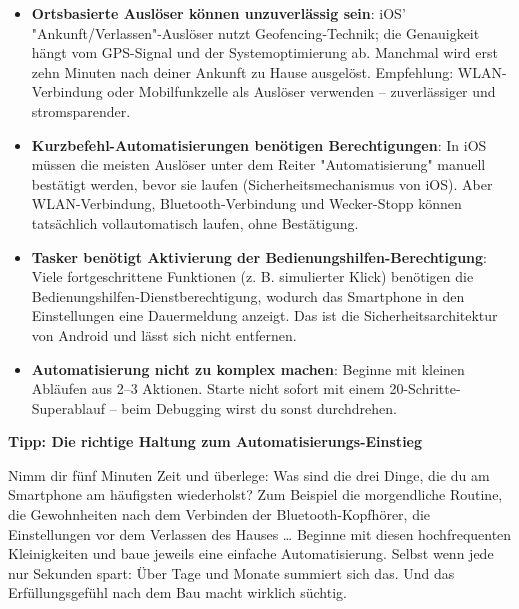 \begin{itemize}
  \item \textbf{Ortsbasierte Auslöser können unzuverlässig sein}: iOS' "Ankunft/Verlassen"-Auslöser nutzt Geofencing-Technik; die Genauigkeit hängt vom GPS-Signal und der Systemoptimierung ab. Manchmal wird erst zehn Minuten nach deiner Ankunft zu Hause ausgelöst. Empfehlung: WLAN-Verbindung oder Mobilfunkzelle als Auslöser verwenden – zuverlässiger und stromsparender.
  \item \textbf{Kurzbefehl-Automatisierungen benötigen Berechtigungen}: In iOS müssen die meisten Auslöser unter dem Reiter "Automatisierung" manuell bestätigt werden, bevor sie laufen (Sicherheitsmechanismus von iOS). Aber WLAN-Verbindung, Bluetooth-Verbindung und Wecker-Stopp können tatsächlich vollautomatisch laufen, ohne Bestätigung.
  \item \textbf{Tasker benötigt Aktivierung der Bedienungshilfen-Berechtigung}: Viele fortgeschrittene Funktionen (z. B. simulierter Klick) benötigen die Bedienungshilfen-Dienstberechtigung, wodurch das Smartphone in den Einstellungen eine Dauermeldung anzeigt. Das ist die Sicherheitsarchitektur von Android und lässt sich nicht entfernen.
  \item \textbf{Automatisierung nicht zu komplex machen}: Beginne mit kleinen Abläufen aus 2–3 Aktionen. Starte nicht sofort mit einem 20-Schritte-Superablauf – beim Debugging wirst du sonst durchdrehen.
\end{itemize}

\textbf{Tipp: Die richtige Haltung zum Automatisierungs-Einstieg}\par

Nimm dir fünf Minuten Zeit und überlege: Was sind die drei Dinge, die du am Smartphone am häufigsten wiederholst? Zum Beispiel die morgendliche Routine, die Gewohnheiten nach dem Verbinden der Bluetooth-Kopfhörer, die Einstellungen vor dem Verlassen des Hauses … Beginne mit diesen hochfrequenten Kleinigkeiten und baue jeweils eine einfache Automatisierung. Selbst wenn jede nur Sekunden spart: Über Tage und Monate summiert sich das. Und das Erfüllungsgefühl nach dem Bau macht wirklich süchtig.

